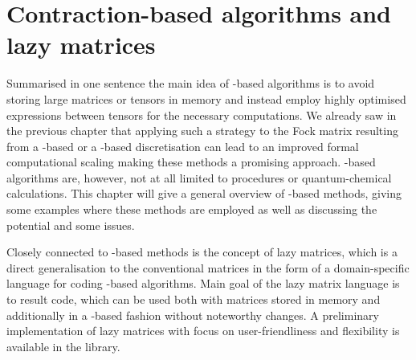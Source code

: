 \chapter{Contraction-based algorithms and lazy matrices}
\label{ch:LazyMatrices}
%
%

\noindent
Summarised in one sentence the main idea of \contraction-based algorithms
is to avoid storing large matrices or tensors in memory
and instead employ highly optimised
\contraction expressions between tensors for the necessary computations.
We already saw in the previous chapter that applying
such a strategy to the Fock matrix resulting from a \FE-based
or a \CS-based discretisation
can lead to an improved formal computational scaling
making these methods a promising approach.
\contraction-based algorithms are, however,
not at all limited to \SCF procedures or quantum-chemical calculations.
This chapter will give a general overview
of \contraction-based methods,
giving some examples where these methods are employed
as well as discussing the potential and some issues.

Closely connected to \contraction-based methods is the concept of lazy matrices,
which is a direct generalisation to the conventional matrices
in the form of a domain-specific language
for coding \contraction-based algorithms.
Main goal of the lazy matrix language is to result code,
which can be used both with matrices stored in memory
and additionally in a \contraction-based fashion without noteworthy changes.
A preliminary \cpp implementation of lazy matrices
with focus on user-friendliness and flexibility
is available in the \lazyten library.



